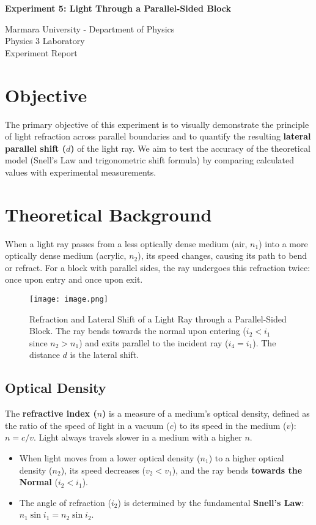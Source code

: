 \documentclass[12pt, a4paper]{article}
\begin{document}
\begin{center}
	\Large \textbf{Experiment 5: Light Through a Parallel-Sided Block}
	\vspace{0.5cm}
	
	\normalsize Marmara University - Department of Physics \\
	Physics 3 Laboratory \\
	Experiment Report
	\vspace{0.5cm}
\end{center}

\section{Objective}
The primary objective of this experiment is to visually demonstrate the principle of light refraction across parallel boundaries and to quantify the resulting \textbf{lateral parallel shift (\(d\))} of the light ray. We aim to test the accuracy of the theoretical model (Snell's Law and trigonometric shift formula) by comparing calculated values with experimental measurements.

\section{Theoretical Background}
When a light ray passes from a less optically dense medium (air, $n_1$) into a more optically dense medium (acrylic, $n_2$), its speed changes, causing its path to bend or refract. For a block with parallel sides, the ray undergoes this refraction twice: once upon entry and once upon exit.

\begin{figure}[H]
    \centering
    \texttt{[image: image.png]}
    \caption{Refraction and Lateral Shift of a Light Ray through a Parallel-Sided Block. The ray bends towards the normal upon entering ($i_2 < i_1$ since $n_2 > n_1$) and exits parallel to the incident ray ($i_4 = i_1$). The distance $d$ is the lateral shift.}
    \label{fig:ray_diagram}
\end{figure}

\subsection{Optical Density}
The \textbf{refractive index ($n$)} is a measure of a medium's optical density, defined as the ratio of the speed of light in a vacuum ($c$) to its speed in the medium ($v$): $n = c/v$. Light always travels slower in a medium with a higher $n$.
\begin{itemize}
    \item When light moves from a lower optical density ($n_1$) to a higher optical density ($n_2$), its speed decreases ($v_2 < v_1$), and the ray bends \textbf{towards the Normal} ($i_2 < i_1$).
    \item The angle of refraction ($i_2$) is determined by the fundamental \textbf{Snell's Law}: $n_1 \sin i_1 = n_2 \sin i_2$.
\end{itemize}
\end{document}

